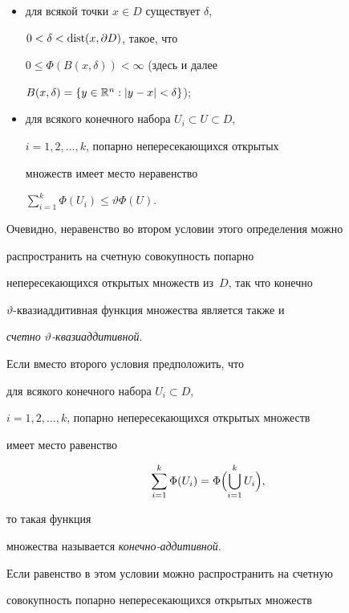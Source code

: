 \begin{itemize}


\item[1)] для всякой точки $x\in D$ существует $\delta$,


$0<\delta<\operatorname{dist} (x,\partial D)$, такое, что


$0\leq\Phi(B(x,\delta))<\infty$ (здесь и далее


$B(x,\delta)=\{y\in{\Bbb R}^n:|y-x|<\delta\}$);


\item[2)] для всякого конечного набора $U_i\subset U\subset D$,


$i=1,2,\dotsc,k$, попарно непересекающихся открытых


множеств имеет место неравенство


$\sum\limits_{i=1}^{k}\Phi(U_i) \leq\vartheta \Phi(U)$.


\end{itemize}





Очевидно, неравенство во втором условии этого определения можно


распространить на счетную совокупность попарно


непересекающихся открытых множеств из~$D$, так что конечно


$\vartheta$-квазиаддитивная функция множества является также и


{\it счетно $\vartheta$-квазиаддитивной}.





Если вместо второго условия предположить, что


для всякого конечного набора $U_i\subset D$,


$i=1,2,\dotsc,k$, попарно непересекающихся открытых множеств


имеет место равенство


$$


\sum\limits_{i=1}^{k}\Phi(U_i)=


\Phi\Bigl(\bigcup\limits_{i=1}^{k}U_i\Bigr),


$$


то такая функция


множества называется {\it конечно-аддитивной}.


Если равенство в этом условии можно распространить на счетную 


совокупность попарно непересекающихся открытых множеств


